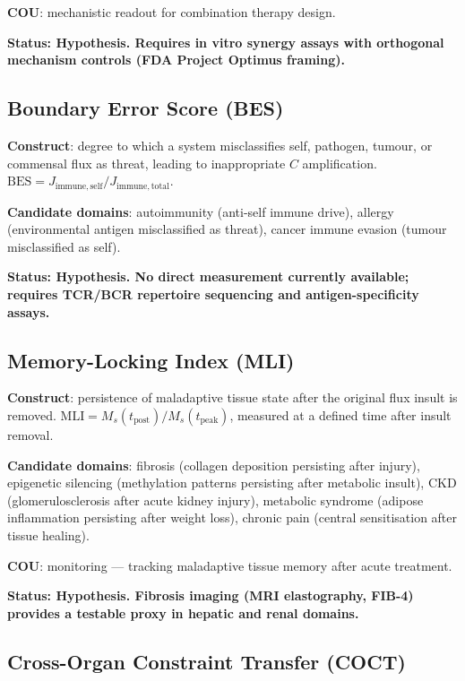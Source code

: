 \documentclass[12pt,a4paper]{article}
\begin{document}
\textbf{COU}: mechanistic readout for combination therapy design.

\textbf{Status: Hypothesis. Requires in vitro synergy assays with orthogonal mechanism controls (FDA Project Optimus framing).}

\subsection{Boundary Error Score (BES)}

\textbf{Construct}: degree to which a system misclassifies self, pathogen, tumour, or commensal flux as threat, leading to inappropriate $C$ amplification. $\mathrm{BES} = J_{\mathrm{immune,self}} / J_{\mathrm{immune,total}}$.

\textbf{Candidate domains}: autoimmunity (anti-self immune drive), allergy (environmental antigen misclassified as threat), cancer immune evasion (tumour misclassified as self).

\textbf{Status: Hypothesis. No direct measurement currently available; requires TCR/BCR repertoire sequencing and antigen-specificity assays.}

\subsection{Memory-Locking Index (MLI)}

\textbf{Construct}: persistence of maladaptive tissue state after the original flux insult is removed. $\mathrm{MLI} = M_s(t_{\mathrm{post}}) / M_s(t_{\mathrm{peak}})$, measured at a defined time after insult removal.

\textbf{Candidate domains}: fibrosis (collagen deposition persisting after injury), epigenetic silencing (methylation patterns persisting after metabolic insult), CKD (glomerulosclerosis after acute kidney injury), metabolic syndrome (adipose inflammation persisting after weight loss), chronic pain (central sensitisation after tissue healing).

\textbf{COU}: monitoring — tracking maladaptive tissue memory after acute treatment.

\textbf{Status: Hypothesis. Fibrosis imaging (MRI elastography, FIB-4) provides a testable proxy in hepatic and renal domains.}

\subsection{Cross-Organ Constraint Transfer (COCT)}
\end{document}
